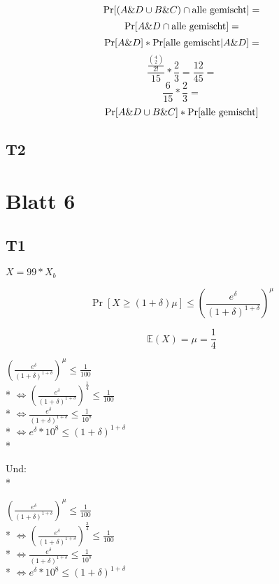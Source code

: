 \documentclass{article}
\begin{document}
$$\Pr[(A\&D \cup B\&C) \cap \hbox{alle gemischt}]=$$
$$\Pr[A\&D \cap \hbox{alle gemischt}]=$$
$$\Pr[A\&D]*\Pr[\hbox{alle gemischt}|A\&D]=$$
$$\frac{\frac{{4 \choose 2}}{2!}}{15}*\frac{2}{3}=\frac{12}{45}=$$
$$\frac{6}{15}*\frac{2}{3}=$$
$$\Pr[A\&D \cup B\&C]*\Pr[\hbox{alle gemischt}]$$

\subsection*{T2}

\section*{Blatt 6}

\subsection*{T1}

$X=99*X_{b}$

$$\Pr[X \ge (1+\delta)\mu] \le (\frac{e^{\delta}}{(1+\delta)^{1+\delta}})^\mu$$

$$\mathbb{E}(X)=\mu=\frac{1}{4}$$

$(\frac{e^{\delta}}{(1+\delta)^{1+\delta}})^\mu \le \frac{1}{100}$\\*
$\Leftrightarrow (\frac{e^{\delta}}{(1+\delta)^{1+\delta}})^{\frac{1}{4}} \le \frac{1}{100}$\\*
$\Leftrightarrow \frac{e^{\delta}}{(1+\delta)^{1+\delta}} \le \frac{1}{10^8}$\\*
$\Leftrightarrow e^{\delta}*10^8 \le (1+\delta)^{1+\delta}$\\*

Und:\\*

$(\frac{e^{\delta}}{(1+\delta)^{1+\delta}})^\mu \le \frac{1}{100}$\\*
$\Leftrightarrow (\frac{e^{\delta}}{(1+\delta)^{1+\delta}})^{\frac{3}{4}} \le \frac{1}{100}$\\*
$\Leftrightarrow \frac{e^{\delta}}{(1+\delta)^{1+\delta}} \le \frac{1}{10^8}$\\*
$\Leftrightarrow e^{\delta}*10^8 \le (1+\delta)^{1+\delta}$
\end{document}
